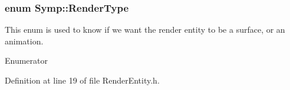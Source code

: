 \hypertarget{namespace_symp_a1f2e90bddea116ff8d3e9e9b7cd34f37}{
\subsubsection[{Render\-Type}]{\setlength{\rightskip}{0pt plus 5cm}enum {\bf Symp\-::\-Render\-Type}}}\label{namespace_symp_a1f2e90bddea116ff8d3e9e9b7cd34f37}
This enum is used to know if we want the render entity to be a surface, or an animation. \begin{Desc}
\item[Enumerator]\par
\begin{description}
\item[{\em 
\hypertarget{namespace_symp_a1f2e90bddea116ff8d3e9e9b7cd34f37a92632ed6da617a29b36fb4a7d3f68d33}{Surface}\label{namespace_symp_a1f2e90bddea116ff8d3e9e9b7cd34f37a92632ed6da617a29b36fb4a7d3f68d33}
}]\item[{\em 
\hypertarget{namespace_symp_a1f2e90bddea116ff8d3e9e9b7cd34f37a1880774450d19273de1b5bcb02e5dbc0}{Animation}\label{namespace_symp_a1f2e90bddea116ff8d3e9e9b7cd34f37a1880774450d19273de1b5bcb02e5dbc0}
}]\end{description}
\end{Desc}


Definition at line 19 of file Render\-Entity.\-h.




